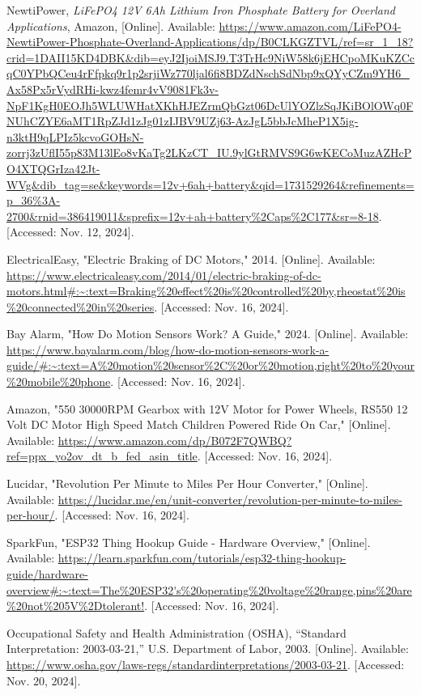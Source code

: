 \begin{thebibliography}{45}
	NewtiPower, \textit{LiFePO4 12V 6Ah Lithium Iron Phosphate Battery for Overland Applications}, Amazon, [Online]. Available: \url{https://www.amazon.com/LiFePO4-NewtiPower-Phosphate-Overland-Applications/dp/B0CLKGZTVL/ref=sr_1_18?crid=1DAII15KD4DBK&dib=eyJ2IjoiMSJ9.T3TrHc9NiW58k6jEHCpoMKuKZCcqC0YPbQCeu4rFfpkq9r1p2srjiWz770ljal6fi8BDZdNschSdNbp9xQYyCZm9YH6_Ax58Px5rVydRHi-kwz4femr4vV9081Fk3v-NpF1KgH0EOJh5WLUWHatXKhHJEZrmQbGzt06DcUlYOZlzSqJKiBOlOWq0FNUhCZYE6aMT1RpZJd1zJg01zIJBV9UZj63-AzJgL5bbJcMheP1X5ig-n3ktH9qLPIz5kcvoGOHsN-zorrj3zUflI55p83M13lEo8vKaTg2LKzCT_IU.9ylGtRMVS9G6wKECoMuzAZHcPO4XTQGrIza42Jt-WVg&dib_tag=se&keywords=12v+6ah+battery&qid=1731529264&refinements=p_36%3A-2700&rnid=386419011&sprefix=12v+ah+battery%2Caps%2C177&sr=8-18}. [Accessed: Nov. 12, 2024].
	
	 ElectricalEasy, "Electric Braking of DC Motors," 2014. [Online]. Available: \url{https://www.electricaleasy.com/2014/01/electric-braking-of-dc-motors.html#:~:text=Braking%20effect%20is%20controlled%20by,rheostat%20is%20connected%20in%20series}. [Accessed: Nov. 16, 2024]. 
	
	 Bay Alarm, "How Do Motion Sensors Work? A Guide," 2024. [Online]. Available: \url{https://www.bayalarm.com/blog/how-do-motion-sensors-work-a-guide/#:~:text=A%20motion%20sensor%2C%20or%20motion,right%20to%20your%20mobile%20phone}. [Accessed: Nov. 16, 2024]. 
	
	Amazon, "550 30000RPM Gearbox with 12V Motor for Power Wheels, RS550 12 Volt DC Motor High Speed Match Children Powered Ride On Car," [Online]. Available: \url{https://www.amazon.com/dp/B072F7QWBQ?ref=ppx_yo2ov_dt_b_fed_asin_title}. [Accessed: Nov. 16, 2024].
	
	Lucidar, "Revolution Per Minute to Miles Per Hour Converter," [Online]. Available: \url{https://lucidar.me/en/unit-converter/revolution-per-minute-to-miles-per-hour/}. [Accessed: Nov. 16, 2024].
	
	SparkFun, "ESP32 Thing Hookup Guide - Hardware Overview," [Online]. Available: \url{https://learn.sparkfun.com/tutorials/esp32-thing-hookup-guide/hardware-overview#:~:text=The%20ESP32's%20operating%20voltage%20range,pins%20are%20not%205V%2Dtolerant!}. [Accessed: Nov. 16, 2024].
	
	Occupational Safety and Health Administration (OSHA), ``Standard Interpretation: 2003-03-21,'' U.S. Department of Labor, 2003. [Online]. Available: \url{https://www.osha.gov/laws-regs/standardinterpretations/2003-03-21}. [Accessed: Nov. 20, 2024].
	

\end{thebibliography}
